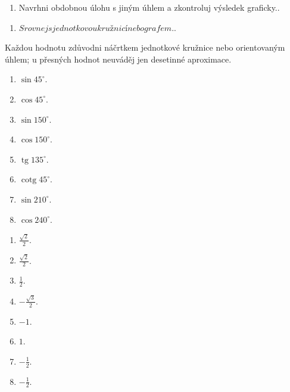 \documentclass[11pt,a4paper]{article}
\begin{document}
\begin{zadaniReseniBox}[title={Rozšíření 1}]
\begin{enumerate}[label=\alph*)]
\item Navrhni obdobnou úlohu s jiným úhlem a zkontroluj výsledek graficky..
\end{enumerate}
\tcblower
\begin{enumerate}[label=\alph*)]
\item $Srovnej s jednotkovou kružnicí nebo grafem.$.
\end{enumerate}
\end{zadaniReseniBox}
Každou hodnotu zdůvodni náčrtkem jednotkové kružnice nebo orientovaným úhlem; u přesných hodnot neuváděj jen desetinné aproximace.
\begin{zadaniReseniBox}[title={Domácí úkol}]
\begin{enumerate}[label=\alph*)]
\item $\sin45^\circ$.
\item $\cos45^\circ$.
\item $\sin150^\circ$.
\item $\cos150^\circ$.
\item $\operatorname{tg}135^\circ$.
\item $\operatorname{cotg}45^\circ$.
\item $\sin210^\circ$.
\item $\cos240^\circ$.
\end{enumerate}
\tcblower
\begin{enumerate}[label=\alph*)]
\item $\frac{\sqrt2}{2}$.
\item $\frac{\sqrt2}{2}$.
\item $\frac{1}{2}$.
\item $-\frac{\sqrt3}{2}$.
\item $-1$.
\item $1$.
\item $-\frac{1}{2}$.
\item $-\frac{1}{2}$.
\end{enumerate}
\end{zadaniReseniBox}
\end{document}
